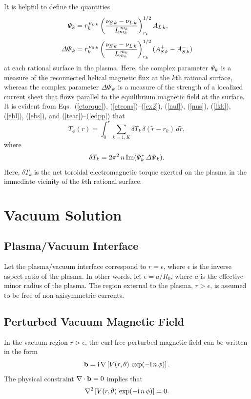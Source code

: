 \documentclass[12pt,prb,aps]{revtex4-1}
\begin{document}
It is helpful to define the quantities\,\cite{am1}
\begin{align}\label{Psidef}
{\mit\Psi}_k&= r_k^{\,\nu_{L\,k}}\left(\frac{\nu_{S\,k}-\nu_{L\,k}}{L_{m_k}^{\,{m_k}}}\right)^{1/2}_{r_k} A_{L\,k},\\[0.5ex]
{\mit\Delta\Psi}_k &= r_k^{\,\nu_{S\,k}}\left(\frac{\nu_{S\,k}-\nu_{L\,k}}{L_{m_k}^{\,m_k}}\right)^{1/2}_{r_k} (A_{S\,k}^+ - A_{S\,k}^-)\label{edpp}
\end{align}
at each rational surface in the plasma. Here, the complex parameter ${\mit\Psi}_k$ is a measure of the reconnected helical magnetic flux at the $k$th rational surface, whereas
the complex parameter ${\mit\Delta\Psi}_k$ is a measure of the strength of a localized current sheet that flows parallel to the equilibrium magnetic field at the surface. 
It is evident from Eqs.~(\ref{etorque}), (\ref{etcons})--(\ref{ex2}), (\ref{nul}), (\ref{nus}), (\ref{lkk}), (\ref{ebl}), (\ref{ebs}), and (\ref{tear})--(\ref{edpp}) that\,\cite{am1,am3}
\begin{equation}\label{e204z}
T_\phi(r) =\int_0^r \sum_{k=1,K}\delta T_k\,\delta(\tilde{r}-r_k)\,d\tilde{r},
\end{equation}
where
\begin{equation}\label{e194t}
\delta T_k = 2\pi^2\,n\,{\rm Im}({\mit\Psi}_k^\ast\,{\mit\Delta\Psi}_k).
\end{equation}
Here, $\delta T_k$ is the net toroidal electromagnetic torque exerted on the plasma in the immediate vicinity of the $k$th rational
surface. 

\section{Vacuum Solution}\label{vacxx}

\subsection{Plasma/Vacuum Interface}
Let the plasma/vacuum interface  correspond to $r=\epsilon$, where  $\epsilon$ is the inverse aspect-ratio of the
plasma. In other words, let $\epsilon=a/R_0$, where $a$ is the effective minor radius of the plasma. 
The region external to the plasma, $r>\epsilon$, is assumed to be  free of non-axisymmetric currents.

\subsection{Perturbed Vacuum Magnetic Field}\label{pertb}
In the vacuum region $r>\epsilon$, the curl-free perturbed magnetic field can be written in the form\,\cite{am1}
\begin{equation}\label{vdef}
{\bf b} = {\rm i}\,\nabla\left[ V(r,\theta)\,\exp(-{\rm i}\,n\,\phi)\right].
\end{equation}
The physical constraint $\nabla\cdot {\bf b} =0$ implies that
\begin{equation}\label{elaplace}
\nabla^2 \left[V(r,\theta)\,\exp(-{\rm i}\,n\,\phi)\right]= 0.
\end{equation}
\end{document}
